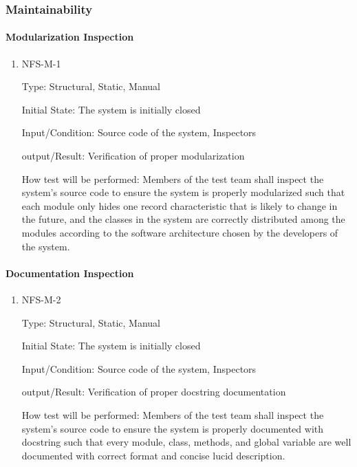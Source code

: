 \documentclass[12pt, titlepage]{article}
\begin{document}
\subsubsection{Maintainability}

\paragraph{Modularization Inspection}
\begin{enumerate}
\item{NFS-M-1\\}

Type: Structural, Static, Manual
                
Initial State: The system is initially closed
                
Input/Condition: Source code of the system, Inspectors
                
output/Result: Verification of proper modularization
                
How test will be performed: Members of the test team shall inspect the system's source code to ensure the system is properly modularized such that each module only hides one record characteristic that is likely to change in the future, and the classes in the system are correctly distributed among the modules according to the software architecture chosen by the developers of the system.

\end{enumerate}

\paragraph{Documentation Inspection}
\begin{enumerate}
\item{NFS-M-2\\}

Type: Structural, Static, Manual
                
Initial State: The system is initially closed
                
Input/Condition: Source code of the system, Inspectors
                
output/Result: Verification of proper docstring documentation
                
How test will be performed: Members of the test team shall inspect the system's source code to ensure the system is properly documented with docstring such that every module, class, methods, and global variable are well documented with correct format and concise lucid description.

\end{enumerate}
\end{document}
